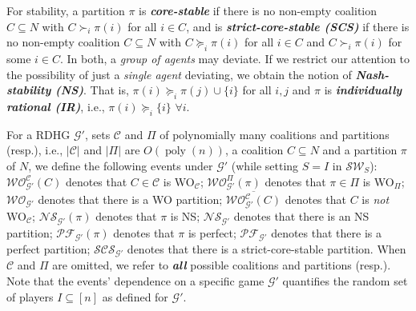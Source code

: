 \documentclass[letterpaper]{article} %
\DeclareMathOperator*{\poly}{poly}
\begin{document}
For stability, a partition $\pi$ is \textit{\textbf{core-stable}} if there is no non-empty coalition $C \subseteq N$ with $C \succ_i \pi(i)$ for all $i \in C$, and is \textit{\textbf{strict-core-stable (SCS)}} if there is no non-empty coalition $C\subseteq N$ with $C \succeq_i \pi(i)$ for all $i \in C$ and $C \succ_i \pi(i)$ for some $i \in C$. In both, a \textit{group of agents} may deviate. If we restrict our attention to the possibility of just a \textit{single agent} deviating, we obtain the notion of \textit{\textbf{Nash-stability (NS)}}. That is, $\pi(i) \succeq_i \pi(j) \cup \{i\}$ for all $i,j$ and $\pi$ is \textit{\textbf{individually rational (IR)}}, i.e., $\pi(i) \succeq_i \{i\}$ $\forall i$. %
%

For a RDHG $\mathcal{G}'$, sets $\mathcal{C}$ and $\Pi$ of polynomially many coalitions and partitions (resp.), i.e., $|\mathcal{C}|$ and $|\Pi|$ are $O(\poly(n))$, a coalition $C \subseteq N$ and a partition $\pi$ of $N$, we define the following events under $\mathcal{G}'$ (while setting $S=I$ in $\mathcal{SW}_S$): %
$\mathcal{WO}_{\mathcal{G}'}^{\mathcal{C}}(C)$ denotes that $C \in \mathcal{C}$ is WO$_\mathcal{C}$; $\mathcal{WO}_{\mathcal{G}'}^{\Pi}(\pi)$ denotes that $\pi \in \Pi$ is WO$_\Pi$; $\mathcal{WO}_{\mathcal{G}'}$ denotes that there is a WO partition; $\overline{\mathcal{WO}^{\mathcal{C}}_{\mathcal{G}'}(C)}$ denotes that $C$ is \textit{not} WO$_\mathcal{C}$; %
$\mathcal{NS}_{\mathcal{G}'}(\pi)$ denotes that $\pi$ is NS; $\mathcal{NS}_{\mathcal{G}'}$ denotes that there is an NS partition; $\mathcal{PF}_{\mathcal{G}'}(\pi)$ denotes that $\pi$ is perfect; $\mathcal{PF}_{\mathcal{G}'}$ denotes that there is a perfect partition; %
$\mathcal{SCS}_{\mathcal{G}'}$ denotes that there is a strict-core-stable partition. When $\mathcal{C}$ and $\Pi$ are omitted, we refer to \textbf{\textit{all}} possible coalitions and partitions (resp.). Note that the events' dependence on a specific game $\mathcal{G}'$ quantifies the random set of players $I \subseteq [n]$ as defined for $\mathcal{G}'$.
%
 
\end{document}
